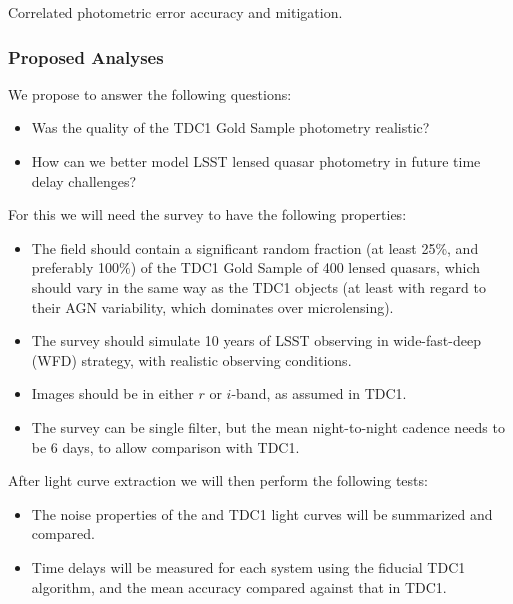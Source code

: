 Correlated photometric error accuracy and mitigation.



\subsubsection{Proposed Analyses}
\label{\secname:stronglensing:analyses}

We propose to answer the following questions:
\begin{itemize}
\item Was the quality of the TDC1 Gold Sample photometry realistic?
\item How can we better model LSST lensed quasar photometry in future time delay challenges?
\end{itemize}

For this we will need the \TwinklesOne survey to have the following
properties:
\begin{itemize}
\item The field should contain a significant random fraction (at least
25\%,  and preferably 100\%) of the TDC1 Gold Sample of 400 lensed
quasars,  which should vary in the same way as the TDC1 objects (at
least with regard to their  AGN variability, which dominates over
microlensing).
\item The survey should simulate 10 years of LSST observing in
wide-fast-deep (WFD) strategy, with realistic observing conditions.
\item Images should be in either $r$ or $i$-band, as assumed in TDC1.
\item The survey can be single filter, but the mean night-to-night
cadence needs to be 6 days, to allow comparison with TDC1.
\end{itemize}

After light curve extraction we will then perform the following tests:
\begin{itemize}
\item The noise properties of the \TwinklesOne and TDC1 light curves
will be summarized and compared.
\item Time delays will be measured for each system using the fiducial
TDC1 algorithm, and the mean accuracy compared against that in TDC1.
\end{itemize}


